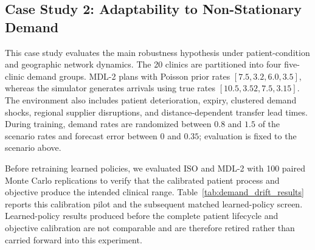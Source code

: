 \documentclass[preprint,review,12pt]{elsarticle}
\begin{document}
\subsection{Case Study 2: Adaptability to Non-Stationary Demand}
\label{subsec:casestudy2}
This case study evaluates the main robustness hypothesis under patient-condition
and geographic network dynamics. The 20 clinics are partitioned into four
five-clinic demand groups. MDL-2 plans with Poisson prior rates
$[7.5,3.2,6.0,3.5]$, whereas the simulator generates arrivals using true rates
$[10.5,3.52,7.5,3.15]$. The environment also includes patient deterioration,
expiry, clustered demand shocks, regional supplier disruptions, and
distance-dependent transfer lead times. During training, demand rates are
randomized between $0.8$ and $1.5$ of the scenario rates and forecast error
between $0$ and $0.35$; evaluation is fixed to the scenario above.

Before retraining learned policies, we evaluated ISO and MDL-2 with 100 paired
Monte Carlo replications to verify that the calibrated patient process and
objective produce the intended clinical range. Table~\ref{tab:demand_drift_results}
reports this calibration pilot and the subsequent matched learned-policy
screen. Learned-policy results produced before the complete patient lifecycle
and objective calibration are not comparable and are therefore retired rather
than carried forward into this experiment.
\end{document}
